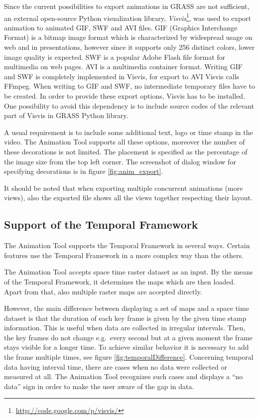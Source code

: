 \documentclass[a4paper,12pt,oneside]{book}
\newcommand{\tf}{Temporal Framework\xspace}
\newcommand{\at}{Animation Tool\xspace}
\begin{document}
\begin{description}
    Since the current possibilities to export animations in GRASS are not sufficient,
    an external open-source Python visualization library,
    \emph{Visvis}\footnote{\url{http://code.google.com/p/visvis/}},
    was used to export animation to animated GIF, SWF and AVI files.
    GIF (Graphics Interchange Format) is a bitmap image format which is characterized
    by widespread usage on web and in presentations, however since it supports only 256 distinct colors,
    lower image quality is expected.
    SWF is a popular Adobe Flash file format for multimedia on web pages.
    AVI is a multimedia container format.
    Writing GIF and SWF is completely implemented in Visvis, for export to AVI Visvis
    calls FFmpeg. When writing to GIF and SWF, no intermediate temporary files have to be created.
    In order to provide these export options, Visvis has to be installed.
    One possibility to avoid this dependency is to include source codes of the relevant
    part of Visvis in GRASS Python library.

      A usual requirement is to include some additional text, logo or time stamp in the video.
      The \at supports all these options, moreover the number of these decorations is not limited.
      The placement is specified as the percentage of the image size from the top left corner.
      The screenshot of dialog window for specifying decorations is in figure \ref{fig:anim_export}.

      It should be noted that when exporting multiple concurrent animations (more views),
      also the exported file shows all the views together respecting their layout.

\end{description}

\subsection{Support of the \tf}
\label{sec:wx.animation:support}
The \at supports the \tf in several ways. Certain features use the \tf in a more complex way than the others.

The \at accepts space time raster dataset as an input. By the means of the \tf, it determines the maps which are then loaded.
Apart from that, also multiple raster maps are accepted directly.

However, the main difference between displaying a set of maps and a space time dataset is
that the duration of each key frame is given by the given time stamp information.
This is useful when data are collected in irregular intervals.
Then, the key frames do not change e.g.\ every second but at a given moment the frame stays visible for a longer time.
To achieve similar behavior it is necessary to add the frame multiple times, see figure \ref{fig:temporalDifference}.
Concerning temporal data having interval time, there are cases when no data were collected or measured at all.
The \at recognizes such cases and displays a ``no data'' sign in order to make the user aware of the gap in data.
\end{document}
